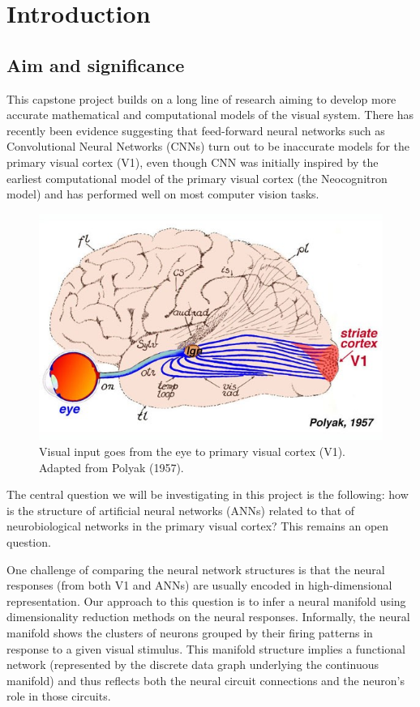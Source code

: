 \chapter{Introduction} 
\label{chapter-intro} 

\section{Aim and significance}
This capstone project builds on a long line of research aiming to develop more accurate mathematical and computational models of the visual system. There has recently been evidence suggesting that feed-forward neural networks such as Convolutional Neural Networks (CNNs) turn out to be inaccurate models for the primary visual cortex (V1), even though CNN was initially inspired by the earliest computational model of the primary visual cortex (the Neocognitron model) and has performed well on most computer vision tasks. 
    \begin{figure}[H]
            \centering
                \includegraphics[width=0.25
             \textwidth]{presentation/figures-models/v1.jpg}
                \caption{Visual input goes from the eye to primary visual cortex (V1). Adapted from Polyak (1957).}
            \end{figure} 
            
The central question we will be investigating in this project is the following: how is the structure of artificial neural networks (ANNs) related to that of neurobiological networks in the primary visual cortex? This remains an open question.
    
\par One challenge of comparing the neural network structures is that the neural responses (from both V1 and ANNs) are usually encoded in high-dimensional representation.  Our approach to this question is to infer a neural manifold using dimensionality reduction methods on the neural responses. Informally, the neural manifold shows the clusters of neurons grouped by their firing patterns in response to a given visual stimulus.  This manifold structure implies a functional network (represented by the discrete data graph underlying the continuous manifold) and thus reflects both the neural circuit connections and the neuron’s role in those circuits. 

